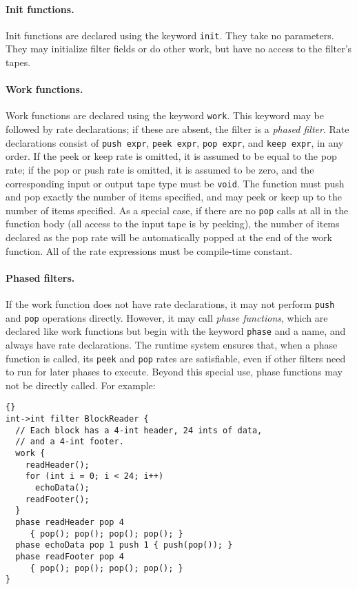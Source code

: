 \documentclass[11pt]{article}
\begin{document}
\paragraph{Init functions.}  Init functions are declared using the
keyword \lstinline|init|.  They take no parameters.  They may initialize
filter fields or do other work, but have no access to the filter's
tapes.

\paragraph{Work functions.}  Work functions are declared using the
keyword \lstinline|work|.  This keyword may be followed by rate
declarations; if these are absent, the filter is a \emph{phased
  filter}.  Rate declarations consist of \lstinline|push expr|,
\lstinline|peek expr|, \lstinline|pop expr|, and
\lstinline|keep expr|, in any order.  If the peek or keep rate is
omitted, it is assumed to be equal to the pop rate; if the pop or push
rate is omitted, it is assumed to be zero, and the corresponding input
or output tape type must be \lstinline|void|.  The function must push
and pop exactly the number of items specified, and may peek or keep up
to the number of items specified.  As a special case, if there are no
\lstinline|pop| calls at all in the function body (all access to the
input tape is by peeking), the number of items declared as the pop
rate will be automatically popped at the end of the work function.
All of the rate expressions must be compile-time constant.

\paragraph{Phased filters.}  If the work function does not have rate
declarations, it may not perform \lstinline|push| and \lstinline|pop|
operations directly.  However, it may call \emph{phase functions},
which are declared like work functions but begin with the keyword
\lstinline|phase| and a name, and always have rate declarations.  The
runtime system ensures that, when a phase function is called, its
\lstinline|peek| and \lstinline|pop| rates are satisfiable, even if
other filters need to run for later phases to execute.  Beyond this
special use, phase functions may not be directly called.  For example:

\begin{lstlisting}{}
int->int filter BlockReader {
  // Each block has a 4-int header, 24 ints of data,
  // and a 4-int footer.
  work {
    readHeader();
    for (int i = 0; i < 24; i++)
      echoData();
    readFooter();
  }
  phase readHeader pop 4
     { pop(); pop(); pop(); pop(); }
  phase echoData pop 1 push 1 { push(pop()); }
  phase readFooter pop 4
     { pop(); pop(); pop(); pop(); }
}
\end{lstlisting}
\end{document}
